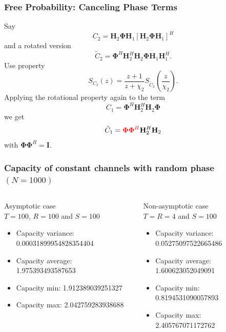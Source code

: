 \documentclass[10pt,tgadventor, onlymath]{beamer}
\begin{document}
\begin{frame}
\frametitle{Free Probability: Canceling Phase Terms}
Say 
\begin{equation}
C_2 = \mathbf{H}_{2}\boldsymbol{\Phi}\mathbf{H}_{1}[\mathbf{H}_{2}\boldsymbol{\Phi}\mathbf{H}_{1}]^H
\end{equation}
and a rotated version 
\begin{equation}
\tilde{C}_2 = \boldsymbol{\Phi}^H\mathbf{H}_{2}^H\mathbf{H}_{2}\boldsymbol{\Phi}\mathbf{H}_{1}\mathbf{H}_{1}^H.
\end{equation}
Use property 
\begin{equation}\label{rotation_property}
S_{C_2}(z) = \frac{z+1}{z+\chi_2} S_{\tilde{C}_2}(\frac{z}{\chi_2}).
\end{equation}
Applying the rotational property again to the term 
\begin{equation}
C_{1} = \boldsymbol{\Phi}^H\mathbf{H}_{2}^H\mathbf{H}_{2}\boldsymbol{\Phi}
\end{equation}
we get 
\begin{equation}
\tilde{C}_{1} = \textcolor{red}{\boldsymbol{\Phi}\boldsymbol{\Phi}^H}\mathbf{H}_{2}^H\mathbf{H}_{2}
\end{equation}
with $\boldsymbol{\Phi}\boldsymbol{\Phi}^H = \mathbf{I}$.
\end{frame}



\begin{frame}
	\frametitle{Capacity of constant channels with random phase $(N=1000)$}
\begin{columns}
\begin{column}{0.5\linewidth}
\centering
Asymptotic case \\ $T = 100$, $ R = 100$ and $S = 100$
\begin{itemize}
\item
Capacity variance:
 0.00031899954828354404
 \item
Capacity average:
 1.975393493587653
 \item
Capacity min:
 1.912389039251327
 \item
Capacity max:
 2.042759283938688
\end{itemize}


\end{column}
\begin{column}{0.5\linewidth}
\centering
Non-asymptotic case\\ $T = R = 4$ and $S = 100$

\begin{itemize}
  \item
 Capacity variance:
 0.05275097522665486
  \item

Capacity average:
 1.600623052049091
  \item

Capacity min:
 0.8194531090057893
  \item

Capacity max:
 2.405767071172762
\end{itemize}
\end{column}
\end{columns}
\end{frame}
\end{document}
